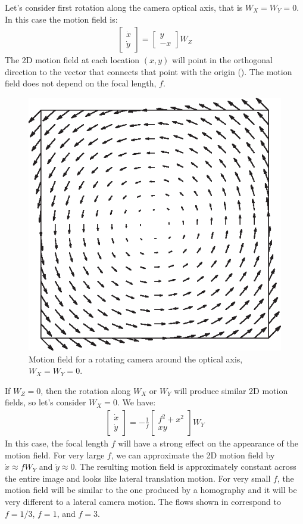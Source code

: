 Let's consider first rotation along the camera optical axis, that is $W_X=W_Y=0$. In this case the motion field is: 
\begin{align}
\begin{bmatrix}
\dot{x} \\
\dot{y}
\end{bmatrix}
= 
\begin{bmatrix}
 y \\
-x  
\end{bmatrix}
W_Z 
\end{align}
The 2D motion field at each location $(x,y)$ will point in the orthogonal direction to the vector that connects that point with the origin (\fig{\ref{fig:motion_wz}}). The motion field does not depend on the focal length, $f$. 

\begin{figure}[h!]
\centerline{
\includegraphics[width=.4\linewidth]{figures/optical_flow/motion_wz.eps}
} 
\caption{Motion field for a rotating camera around the optical axis, $W_X=W_Y=0$.}
\label{fig:motion_wz}
\end{figure}

If $W_Z=0$, then the rotation along $W_X$ or $W_Y$ will produce similar 2D motion fields, so let's consider $W_X=0$. We have:
\begin{align}
\begin{bmatrix}
\dot{x} \\
\dot{y}
\end{bmatrix}
= 
-\frac{1}{f}
\begin{bmatrix}
f^2+x^2 \\
xy  
\end{bmatrix}
W_Y 
\end{align}
In this case, the focal length $f$ will have a strong effect on the appearance of the motion field. For very large $f$, we can approximate the 2D motion field by $\dot{x} \approx f W_Y$ and $\dot{y} \approx 0$. The resulting motion field is approximately constant across the entire image and looks like lateral translation motion. For very small $f$, the motion field will be similar to the one produced by a homography and it will be very different to a lateral camera motion. The flows shown in \fig{\ref{fig:motion_wy_f03_f1_f3}} correspond to $f=1/3$, $f=1$, and $f=3$.


